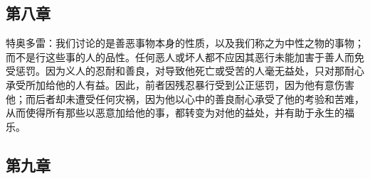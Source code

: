 
\subsection{第八章}

\par

特奥多雷：我们讨论的是善恶事物本身的性质，以及我们称之为中性之物的事物；而不是行这些事的人的品性。任何恶人或坏人都不应因其恶行未能加害于善人而免受惩罚。因为义人的忍耐和善良，对导致他死亡或受苦的人毫无益处，只对那耐心承受所加给他的人有益。因此，前者因残忍暴行受到公正惩罚，因为他有意伤害他；而后者却未遭受任何灾祸，因为他以心中的善良耐心承受了他的考验和苦难，从而使得所有那些以恶意加给他的事，都转变为对他的益处，并有助于永生的福乐。\par


\subsection{第九章}

\par

